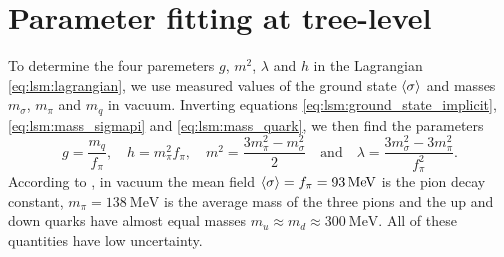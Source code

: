 \section{Parameter fitting at tree-level}
\label{sec:lsm:parameter_fit}

To determine the four paremeters $g$, $m^2$, $\lambda$ and $h$ in the Lagrangian \eqref{eq:lsm:lagrangian},
we use measured values of the ground state $\langle \sigma \rangle$ and masses $m_\sigma$, $m_\pi$ and $m_q$ in vacuum.
Inverting equations \eqref{eq:lsm:ground_state_implicit}, \eqref{eq:lsm:mass_sigmapi} and \eqref{eq:lsm:mass_quark}, we then find the parameters
\begin{equation}
	g       = \frac{m_q}{f_\pi}, \quad %
	h       = m_\pi^2 f_\pi, \quad %
	m^2     = \frac{3m_\pi^2 - m_\sigma^2}{2} \quad \text{and} \quad %
	\lambda = \frac{3 m_\sigma^2 - 3 m_\pi^2}{f_\pi^2} .    %
\label{eq:lsm:parameters}
\end{equation}
According to \cite{ref:pdg_review_2021}, in vacuum the mean field $\langle \sigma \rangle = f_\pi = \SI{93}{\mega\electronvolt}$ is the pion decay constant,
$m_\pi = \SI{138}{\mega\electronvolt}$ is the average mass of the three pions
and the up and down quarks have almost equal masses $m_u \approx m_d \approx \SI{300}{\mega\electronvolt}$.
All of these quantities have low uncertainty.

